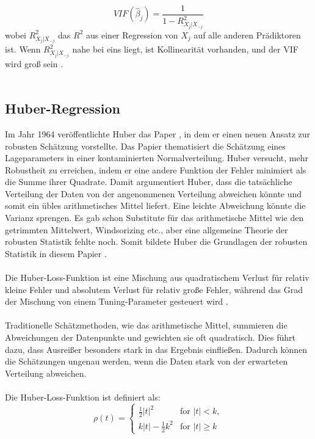 \begin{equation}
VIF(\hat{\beta}_j) = \frac{1}{1 - R^2_{X_j|X_{-j}}}
\label{vif}
\end{equation}
wobei \( R^2_{X_j|X_{-j}} \) das \( R^2 \) aus einer Regression von \( X_j \) auf alle anderen Prädiktoren ist. Wenn \( R^2_{X_j|X_{-j}} \) nahe bei eins liegt, ist Kollinearität vorhanden, und der VIF wird groß sein \cite{james2013introduction}.\\\\
\subsection{Huber-Regression}
\label{huberregression}
Im Jahr 1964 veröffentlichte Huber das Paper , in dem er einen neuen Ansatz zur robusten Schätzung vorstellte. Das Papier thematisiert die Schätzung eines Lageparameters in einer kontaminierten Normalverteilung. Huber versucht, mehr Robustheit zu erreichen, indem er eine andere Funktion der Fehler minimiert als die Summe ihrer Quadrate. Damit argumentiert Huber, dass die tatsächliche Verteilung der Daten von der angenommenen Verteilung abweichen könnte und somit ein übles arithmetisches Mittel liefert. Eine leichte Abweichung könnte die Varianz sprengen. Es gab schon Substitute für das arithmetische Mittel wie den getrimmten Mittelwert, Windsorizing etc., aber eine allgemeine Theorie der robusten Statistik fehlte noch. Somit bildete Huber die Grundlagen der robusten Statistik in diesem Papier \cite{huberpapier}. \\\\
Die Huber-Loss-Funktion ist eine Mischung aus quadratischem Verlust für relativ kleine Fehler und absolutem Verlust für relativ große Fehler, während das Grad der Mischung von einem Tuning-Parameter gesteuert wird \cite{indirekthuber}. 
\\\\
Traditionelle Schätzmethoden, wie das arithmetische Mittel, summieren die Abweichungen der Datenpunkte und gewichten sie oft quadratisch. Dies führt dazu, dass Ausreißer besonders stark in das Ergebnis einfließen. Dadurch können die Schätzungen ungenau werden, wenn die Daten stark von der erwarteten Verteilung abweichen.    \\\\
Die Huber-Loss-Funktion ist definiert als:
\begin{equation}
\rho(t) = 
\begin{cases} 
  \frac{1}{2} |t|^2 & \text{for } |t| < k, \\ 
  k |t| - \frac{1}{2} k^2 & \text{for } |t| \geq k 
\end{cases}
\label{eq:huber}
\end{equation}
